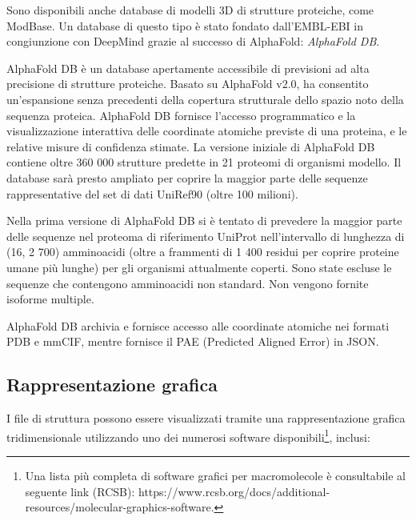 \par Sono disponibili anche database di modelli 3D di strutture proteiche, come ModBase. Un database di questo tipo è stato fondato dall'EMBL-EBI in congiunzione con DeepMind grazie al successo di AlphaFold: \textit{AlphaFold DB}.

\par AlphaFold DB è un database apertamente accessibile di previsioni ad alta precisione di strutture proteiche. Basato su AlphaFold v2.0, ha consentito un'espansione senza precedenti della copertura strutturale dello spazio noto della sequenza proteica. AlphaFold DB fornisce l'accesso programmatico e la visualizzazione interattiva delle coordinate atomiche previste di una proteina, e le relative misure di confidenza stimate. La versione iniziale di AlphaFold DB contiene oltre 360 000 strutture predette in 21 proteomi di organismi modello. Il database sarà presto ampliato per coprire la maggior parte delle sequenze rappresentative del set di dati UniRef90 (oltre 100 milioni)\supercite{varadi2021alphafold}.

\par Nella prima versione di AlphaFold DB si è tentato di prevedere la maggior parte delle sequenze nel proteoma di riferimento UniProt nell'intervallo di lunghezza di (16, 2 700) amminoacidi (oltre a frammenti di 1 400 residui per coprire proteine umane più lunghe) per gli organismi attualmente coperti. Sono state escluse le sequenze che contengono amminoacidi non standard. Non vengono fornite isoforme multiple.

\par AlphaFold DB archivia e fornisce accesso alle coordinate atomiche nei formati PDB e mmCIF, mentre fornisce il PAE (Predicted Aligned Error) in JSON.



\subsection{Rappresentazione grafica}

I file di struttura possono essere visualizzati tramite una rappresentazione grafica tridimensionale utilizzando uno dei numerosi software disponibili\footnote{Una lista più completa di software grafici per macromolecole è consultabile al seguente link (RCSB): https://www.rcsb.org/docs/additional-resources/molecular-graphics-software.}, inclusi:

